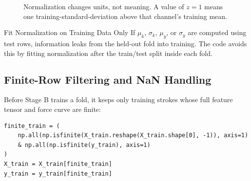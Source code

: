 \documentclass[11pt]{article}
\begin{document}
\begin{figure}[H]
  \centering
  \caption{Normalization changes units, not meaning. A value of \(z=1\) means
  one training-standard-deviation above that channel's training mean.}
  \label{fig:stageb-normalization}
\end{figure}

\begin{warningbox}{Fit Normalization on Training Data Only}
If \(\mu_k\), \(\sigma_k\), \(\mu_y\), or \(\sigma_y\) are computed using test
rows, information leaks from the held-out fold into training. The code avoids
this by fitting normalization after the train/test split inside each fold.
\end{warningbox}

\subsection{Finite-Row Filtering and NaN Handling}

Before Stage B trains a fold, it keeps only training strokes whose full feature
tensor and force curve are finite:

\begin{lstlisting}
finite_train = (
    np.all(np.isfinite(X_train.reshape(X_train.shape[0], -1)), axis=1)
    & np.all(np.isfinite(y_train), axis=1)
)
X_train = X_train[finite_train]
y_train = y_train[finite_train]
\end{lstlisting}
\end{document}
